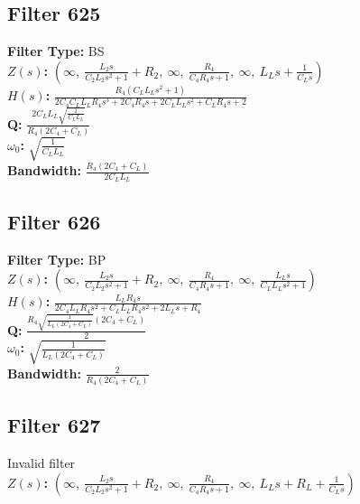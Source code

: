 \documentclass{article}
\begin{document}
\subsection*{Filter 625}
\textbf{Filter Type:} BS \\ 
\textbf{$Z(s)$:} $\left( \infty, \  \frac{L_{2} s}{C_{2} L_{2} s^{2} + 1} + R_{2}, \  \infty, \  \frac{R_{4}}{C_{4} R_{4} s + 1}, \  \infty, \  L_{L} s + \frac{1}{C_{L} s}\right)$ \\ 
\textbf{$H(s)$:} $\frac{R_{4} \left(C_{L} L_{L} s^{2} + 1\right)}{2 C_{4} C_{L} L_{L} R_{4} s^{3} + 2 C_{4} R_{4} s + 2 C_{L} L_{L} s^{2} + C_{L} R_{4} s + 2}$ \\ 
\textbf{Q:} $\frac{2 C_{L} L_{L} \sqrt{\frac{1}{C_{L} L_{L}}}}{R_{4} \left(2 C_{4} + C_{L}\right)}$ \\ 
\textbf{$\omega_0$:} $\sqrt{\frac{1}{C_{L} L_{L}}}$ \\ 
\textbf{Bandwidth:} $\frac{R_{4} \left(2 C_{4} + C_{L}\right)}{2 C_{L} L_{L}}$ \\ 
\subsection*{Filter 626}
\textbf{Filter Type:} BP \\ 
\textbf{$Z(s)$:} $\left( \infty, \  \frac{L_{2} s}{C_{2} L_{2} s^{2} + 1} + R_{2}, \  \infty, \  \frac{R_{4}}{C_{4} R_{4} s + 1}, \  \infty, \  \frac{L_{L} s}{C_{L} L_{L} s^{2} + 1}\right)$ \\ 
\textbf{$H(s)$:} $\frac{L_{L} R_{4} s}{2 C_{4} L_{L} R_{4} s^{2} + C_{L} L_{L} R_{4} s^{2} + 2 L_{L} s + R_{4}}$ \\ 
\textbf{Q:} $\frac{R_{4} \sqrt{\frac{1}{L_{L} \left(2 C_{4} + C_{L}\right)}} \left(2 C_{4} + C_{L}\right)}{2}$ \\ 
\textbf{$\omega_0$:} $\sqrt{\frac{1}{L_{L} \left(2 C_{4} + C_{L}\right)}}$ \\ 
\textbf{Bandwidth:} $\frac{2}{R_{4} \left(2 C_{4} + C_{L}\right)}$ \\ 
\subsection*{Filter 627}
Invalid filter \\ 
\textbf{$Z(s)$:} $\left( \infty, \  \frac{L_{2} s}{C_{2} L_{2} s^{2} + 1} + R_{2}, \  \infty, \  \frac{R_{4}}{C_{4} R_{4} s + 1}, \  \infty, \  L_{L} s + R_{L} + \frac{1}{C_{L} s}\right)$ \\ 
\end{document}
